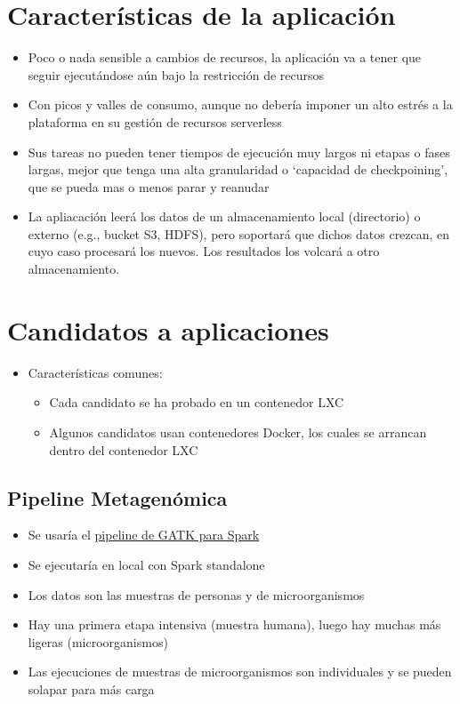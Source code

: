 \documentclass[preprint,3p]{elsarticle}
\begin{document}
\newpage

\section{Características de la aplicación}

\begin{itemize}

	\item Poco o nada sensible a cambios de recursos, la aplicación va a tener que seguir ejecutándose aún bajo la restricción de recursos

	\item Con picos y valles de consumo, aunque no debería imponer un alto estrés a la plataforma en su gestión de recursos serverless
		

	\item Sus tareas no pueden tener tiempos de ejecución muy largos ni etapas o fases largas, mejor que tenga una alta granularidad o `capacidad de checkpoining', que se pueda mas o menos parar y reanudar
	
	\item La apliacación leerá los datos de un almacenamiento local (directorio) o externo (e.g., bucket S3, HDFS), pero soportará que dichos datos crezcan, en cuyo caso procesará los nuevos. Los resultados los volcará a otro almacenamiento.
			
\end{itemize}


\section{Candidatos a aplicaciones}


\begin{itemize}
	\item Características comunes:
	\begin{itemize}
		\item Cada candidato se ha probado en un contenedor LXC
		\item Algunos candidatos usan contenedores Docker, los cuales se arrancan dentro del contenedor LXC
	\end{itemize}
\end{itemize}

\subsection{Pipeline Metagenómica}

\begin{itemize}
	\item Se usaría el \href{https://gatk.broadinstitute.org/hc/en-us/articles/13832627644443-PathSeqPipelineSpark}{pipeline de GATK para Spark}
	\item Se ejecutaría en local con Spark standalone
	\item Los datos son las muestras de personas y de microorganismos
	\item Hay una primera etapa intensiva (muestra humana), luego hay muchas más ligeras (microorganismos)
	\item Las ejecuciones de muestras de microorganismos son individuales y se pueden solapar para más carga
\end{itemize}
\end{document}
